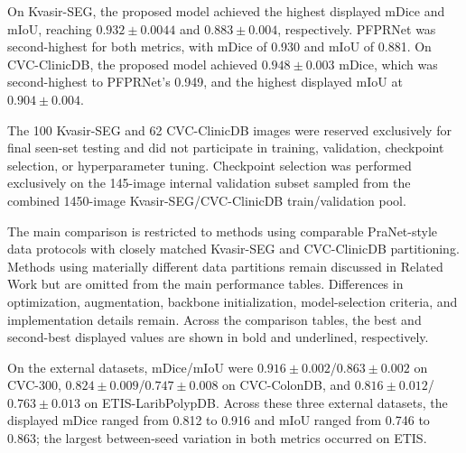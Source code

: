 On Kvasir-SEG, the proposed model achieved the highest displayed mDice and mIoU,
reaching $0.932\pm0.0044$ and $0.883\pm0.004$, respectively. PFPRNet was
second-highest for both metrics, with mDice of 0.930 and mIoU of 0.881. On
CVC-ClinicDB, the proposed model achieved $0.948\pm0.003$ mDice, which was
second-highest to PFPRNet's 0.949, and the highest displayed mIoU at
$0.904\pm0.004$.

The 100 Kvasir-SEG and 62 CVC-ClinicDB images were reserved exclusively for final
seen-set testing and did not participate in training, validation, checkpoint selection,
or hyperparameter tuning. Checkpoint selection was performed exclusively on the
145-image internal validation subset sampled from the combined 1450-image
Kvasir-SEG/CVC-ClinicDB train/validation pool.

The main comparison is restricted to methods using comparable PraNet-style data
protocols with closely matched Kvasir-SEG and CVC-ClinicDB partitioning. Methods
using materially different data partitions remain discussed in Related Work but are
omitted from the main performance tables. Differences in optimization, augmentation,
backbone initialization, model-selection criteria, and implementation details remain.
Across the comparison tables, the best and second-best displayed values are shown in
bold and underlined, respectively.

On the external datasets, mDice/mIoU were
$0.916\pm0.002$/$0.863\pm0.002$ on CVC-300,
$0.824\pm0.009$/$0.747\pm0.008$ on CVC-ColonDB, and
$0.816\pm0.012$/$0.763\pm0.013$ on ETIS-LaribPolypDB. Across these three
external datasets, the displayed mDice ranged from 0.812 to 0.916 and mIoU
ranged from 0.746 to 0.863; the largest between-seed variation in both metrics
occurred on ETIS.

